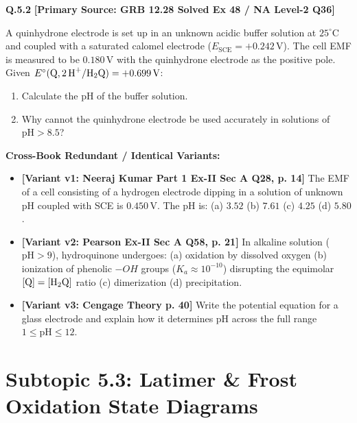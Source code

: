 \begin{problembox}
\textbf{Q.5.2} \hfill \textbf{[Primary Source: GRB  12.28 Solved Ex 48 / NA Level-2 Q36]}
\label{q:qb-c5-02}

A quinhydrone electrode is set up in an unknown acidic buffer solution at $25^\circ\text{C}$ and coupled with a saturated calomel electrode ($E_{\text{SCE}} = +0.242\,\text{V}$). The cell EMF is measured to be $0.180\,\text{V}$ with the quinhydrone electrode as the positive pole. Given $E^\circ(\ce{Q, 2H+/H2Q}) = +0.699\,\text{V}$:
\begin{enumerate}[label=(\alph*)]
    \item Calculate the $\text{pH}$ of the buffer solution.
    \item Why cannot the quinhydrone electrode be used accurately in solutions of $\text{pH} > 8.5$?
\end{enumerate}

\tcbline
\textbf{\color{accentamber}Cross-Book Redundant / Identical Variants:}
\begin{itemize}[leftmargin=*,itemsep=2pt]
    \item \textbf{[Variant v1: Neeraj Kumar Part 1 Ex-II Sec A Q28, p. 14]} The EMF of a cell consisting of a hydrogen electrode dipping in a solution of unknown pH coupled with SCE is $0.450\,\text{V}$. The pH is: (a) $3.52$ (b) $7.61$ (c) $4.25$ (d) $5.80$.
    \item \textbf{[Variant v2: Pearson Ex-II Sec A Q58, p. 21]} In alkaline solution ($\text{pH} > 9$), hydroquinone undergoes: (a) oxidation by dissolved oxygen (b) ionization of phenolic $-OH$ groups ($K_a \approx 10^{-10}$) disrupting the equimolar $[\ce{Q}] = [\ce{H2Q}]$ ratio (c) dimerization (d) precipitation.
    \item \textbf{[Variant v3: Cengage Theory p. 40]} Write the potential equation for a glass electrode and explain how it determines pH across the full range $1 \le \text{pH} \le 12$.
\end{itemize}
\end{problembox}

\section{Subtopic 5.3: Latimer \& Frost Oxidation State Diagrams}

